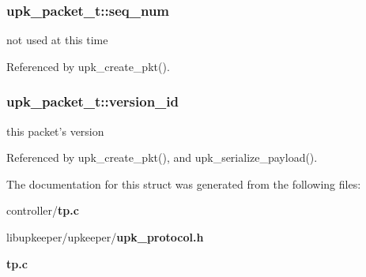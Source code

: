 \subsubsection[{seq\_\-num}]{ {\bf upk\_\-packet\_\-t::seq\_\-num}}\label{structupk__packet__t_a80fc00b3c474ce2364b738c0cc2eefa2}
not used at this time 

Referenced by upk\_\-create\_\-pkt().

\subsubsection[{version\_\-id}]{ {\bf upk\_\-packet\_\-t::version\_\-id}}\label{structupk__packet__t_a7af5bfe76852db8538b31fe06418c9d4}
this packet's version 

Referenced by upk\_\-create\_\-pkt(), and upk\_\-serialize\_\-payload().



The documentation for this struct was generated from the following files:\begin{DoxyCompactItemize}
\item 
controller/{\bf tp.c}\item 
libupkeeper/upkeeper/{\bf upk\_\-protocol.h}\item 
{\bf tp.c}\end{DoxyCompactItemize}
